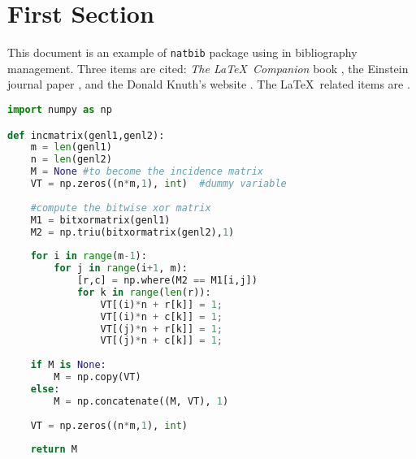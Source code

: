 \documentclass[a4paper,12pt]{article}
\author{Васильев Дмитрий Олегович}
\begin{document}
\maketitle

\tableofcontents

\clearpage

\section{First Section}
This document is an example of \texttt{natbib} package using in bibliography management. Three items are cited: \textit{The \LaTeX\ Companion} book \cite{latexcompanion}, the Einstein journal paper \citet{einstein}, and the Donald Knuth's website \cite{knuthwebsite}. The \LaTeX\ related items are \cite{latexcompanion,knuthwebsite}.

\begin{lstlisting}[language=Python, caption=Python example]
import numpy as np

def incmatrix(genl1,genl2):
	m = len(genl1)
	n = len(genl2)
	M = None #to become the incidence matrix
	VT = np.zeros((n*m,1), int)  #dummy variable
	
	#compute the bitwise xor matrix
	M1 = bitxormatrix(genl1)
	M2 = np.triu(bitxormatrix(genl2),1) 
	
	for i in range(m-1):
		for j in range(i+1, m):
			[r,c] = np.where(M2 == M1[i,j])
			for k in range(len(r)):
				VT[(i)*n + r[k]] = 1;
				VT[(i)*n + c[k]] = 1;
				VT[(j)*n + r[k]] = 1;
				VT[(j)*n + c[k]] = 1;
	
	if M is None:
		M = np.copy(VT)
	else:
		M = np.concatenate((M, VT), 1)
	
	VT = np.zeros((n*m,1), int)
	
	return M
\end{lstlisting}

\clearpage


\end{document}
